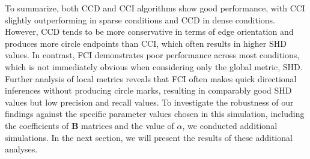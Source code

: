 \documentclass[twoside, 11pt]{article}
\newcommand*{\figref}[2][]{%
  \hyperref[{fig:#2}]{%
    Figure~\ref*{fig:#2}%
    \ifx\\#1\\%
    \else
      #1%
    \fi
  }%
}
\begin{document}

To summarize, both CCD and CCI algorithms show good performance, with CCI slightly outperforming in sparse conditions and CCD in dense conditions. However, CCD tends to be more conservative in terms of edge orientation and produces more circle endpoints than CCI, which often results in higher SHD values. In contrast, FCI demonstrates poor performance across most conditions, which is not immediately obvious when considering only the global metric, SHD. Further analysis of local metrics reveals that FCI often makes quick directional inferences without producing circle marks, resulting in comparably good SHD values but low precision and recall values.
To investigate the robustness of our findings against the specific parameter values chosen in this simulation, including the coefficients of $\mathbf{B}$ matrices and the value of $\alpha$, we conducted additional simulations. In the next section, we will present the results of these additional analyses.
\end{document}

